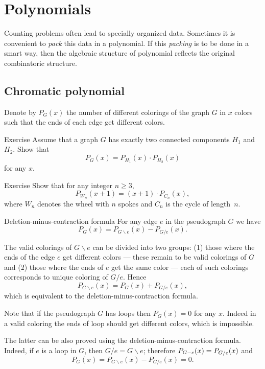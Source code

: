 \chapter{Polynomials}

Counting problems often lead to specially organized data.
Sometimes it is convenient to \emph{pack} this data in a polynomial.
If this \emph{packing} is to be done in a smart way, then the algebraic structure of polynomial reflects the original combinatoric structure.

\section*{Chromatic polynomial}

Denote by $P_G(x)$ the number of different colorings of the graph $G$ in $x$ colors such that the ends of each edge get different colors.

\begin{thm}{Exercise}
Assume that a graph $G$ has exactly two connected components $H_1$ and $H_2$.
Show that 
\[P_G(x)=P_{H_1}(x)\cdot P_{H_2}(x)\]
for any $x$.
\end{thm}

\begin{thm}{Exercise}
Show that for any integer $n\ge 3$,
\[P_{W_n}(x+1)=(x+1)\cdot P_{C_n}(x),\]
where $W_n$ denotes the wheel with $n$ spokes and $C_n$ is the cycle of length~$n$.
\end{thm}

\begin{thm}{Deletion-minus-contraction formula}\label{thm:deletion-minus-contraction}
For any edge $e$ in the pseudograph $G$ we have
\[P_G(x)=P_{G\backslash e}(x)-P_{G/e}(x).\]
\end{thm}

The valid colorings of $G\backslash e$ can be divided into two groups: 
(1) those where the ends of the edge $e$ get different colors --- these remain to be valid colorings of $G$ and (2) those where the ends of $e$ get the same color --- each of such colorings corresponds to unique coloring of $G/e$.
Hence
\[P_{G\backslash e}(x)=P_G(x)+P_{G/e}(x),\]
which is equivalent to the deletion-minus-contraction formula.
\qeds

Note that if the pseudograph $G$ has loops then $P_G(x)=0$ for any $x$.
Indeed in a valid coloring the ends of loop should get different colors, which is impossible.

The latter can be also proved using the deletion-minus-contraction formula.
Indeed, if $e$ is a loop in $G$, then $G/e=G\backslash e$;
therefore $P_{G\backslash e}(x)\z=P_{G/e}(x)$ and
\[P_G(x)=P_{G\backslash e}(x)-P_{G/e}(x) =0.\]

